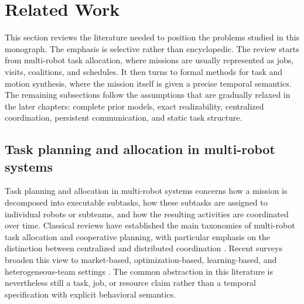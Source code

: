\section{Related Work}
\label{ch01:sec:related_work}

This section reviews the literature needed to position the problems studied in this
monograph. The emphasis is selective rather than encyclopedic. The review starts from
multi-robot task allocation, where missions are usually represented as jobs, visits,
coalitions, and schedules. It then turns to formal methods for task and motion synthesis,
where the mission itself is given a precise temporal semantics. The remaining subsections
follow the assumptions that are gradually relaxed in the later chapters: complete prior
models, exact realizability, centralized coordination, persistent communication, and
static task structure.

\subsection{Task planning and allocation in multi-robot systems}
\label{sec:ch01:rw:allocation}

Task planning and allocation in multi-robot systems concerns how a mission is decomposed
into executable subtasks, how these subtasks are assigned to individual robots or
subteams, and how the resulting activities are coordinated over time. Classical reviews
have established the main taxonomies of multi-robot task allocation and cooperative
planning, with particular emphasis on the distinction between centralized and distributed
coordination \citep{khamis2015multi, torreno2017cooperative}. Recent surveys broaden this
view to market-based, optimization-based, learning-based, and heterogeneous-team settings
\citep{quinton2023market, athira2025systematic, almahmud2026review}. The common abstraction
in this literature is nevertheless still a task, job, or resource claim rather than a
temporal specification with explicit behavioral semantics.

